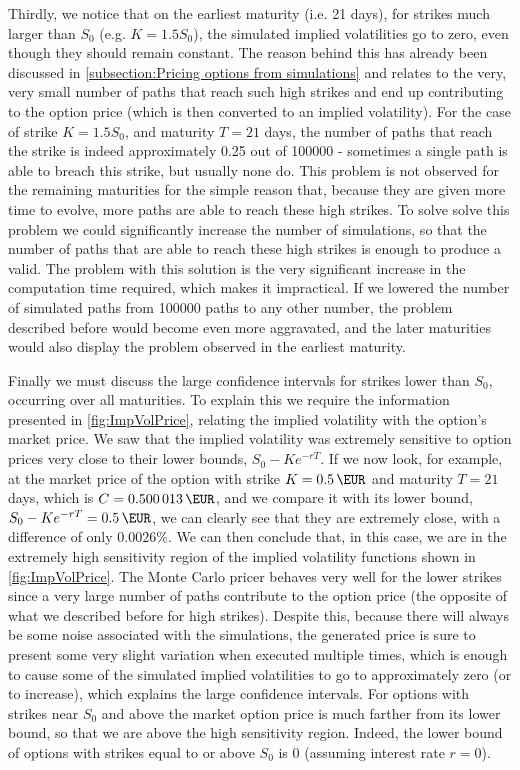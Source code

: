 Thirdly, we notice that on the earliest maturity (i.e. 21 days), for strikes much larger than $S_0$ (e.g. $K=1.5S_0$), the simulated implied volatilities go to zero, even though they should remain constant. The reason behind this has already been discussed in \autoref{subsection:Pricing options from simulations} and relates to the very, very small number of paths that reach such high strikes and end up contributing to the option price (which is then converted to an implied volatility). For the case of strike $K=1.5S_0$, and maturity $T=21$ days, the number of paths that reach the strike is indeed approximately 0.25 out of 100000 - sometimes a single path is able to breach this strike, but usually none do. This problem is not observed for the remaining maturities for the simple reason that, because they are given more time to evolve, more paths are able to reach these high strikes.
To solve solve this problem we could significantly increase the number of simulations, so that the number of paths that are able to reach these high strikes is enough to produce a valid. The problem with this solution is the very significant increase in the computation time required, which makes it impractical.
If we lowered the number of simulated paths from 100000 paths to any other number, the problem described before would become even more aggravated, and the later maturities would also display the problem observed in the earliest maturity.

Finally we must discuss the large confidence intervals for strikes lower than $S_0$, occurring over all maturities. To explain this we require the information presented in \autoref{fig:ImpVolPrice}, relating the implied volatility with the option's market price. We saw that the implied volatility was extremely sensitive to option prices very close to their lower bounds, $S_0-Ke^{-rT}$. If we now look, for example, at the market price of the option with strike $K=\SI{0.5}{\EUR}$ and maturity $T=21$ days, which is $C=\SI{0.500013}{\EUR}$, and we compare it with its lower bound, $S_0-Ke^{-rT}=\SI{0.5}{\EUR}$, we can clearly see that they are extremely close, with a difference of only $0.0026\%$. We can then conclude that, in this case, we are in the extremely high sensitivity region of the implied volatility functions shown in \autoref{fig:ImpVolPrice}.
The Monte Carlo pricer behaves very well for the lower strikes since a very large number of paths contribute to the option price (the opposite of what we described before for high strikes). Despite this, because there will always be some noise associated with the simulations, the generated price is sure to present some very slight variation when executed multiple times, which is enough to cause some of the simulated implied volatilities to go to approximately zero (or to increase), which explains the large confidence intervals. For options with strikes near $S_0$ and above the market option price is much farther from its lower bound, so that we are above the high sensitivity region. Indeed, the lower bound of options with strikes equal to or above $S_0$ is 0 (assuming interest rate $r=0$).

